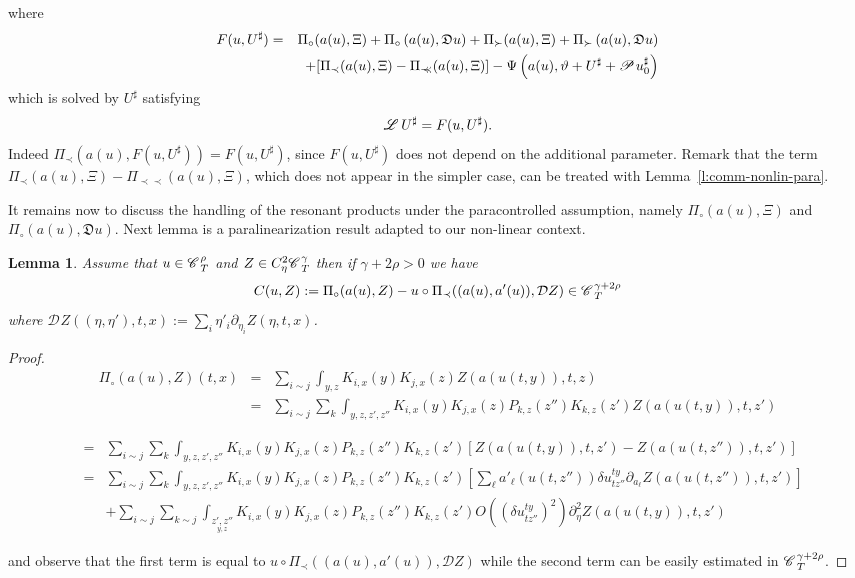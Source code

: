\documentclass[11pt,reqno]{amsart}
\newcommand{\assign}{:=}
\newcommand{\precprec}{\prec\!\!\!\prec}
\newtheorem{lemma}[theorem]{Lemma}
\newcommand{\CC}{\mathscr{C} \hspace{.1em}}
\newcommand{\LL}{\mathscr{L} \hspace{.2em}}
\newcommand{\PP}{\mathscr{P} \hspace{.1em}}
\newcommand{\DF}{\mathfrak{D}}
\begin{document}
where
\begin{eqnarray*}
  F (u, U^{\sharp}) & = & \Pi_{\circ} (a (u), \Xi) + \Pi_{\circ} \left( a (u),
  \DF u \right) + \Pi_{\succ} (a (u), \Xi) + \Pi_{\succ} \left( a (u), \DF u
  \right)\\
  &  & + [\Pi_{\prec} (a (u), \Xi) - \Pi_{\precprec} (a (u), \Xi)] - \Psi
  \left( a (u), \vartheta + U^{\sharp} + \PP u^{\sharp}_0 \right)
\end{eqnarray*}
which is solved by $U^{\sharp}$ satisfying
\[ \LL U^{\sharp} = F (u, U^{\sharp}) . \]
Indeed $\Pi_{\prec} (a (u), F (u, U^{\sharp})) = F (u, U^{\sharp})$, since $F
(u, U^{\sharp})$ does not depend on the additional parameter. Remark that the
term $\Pi_{\prec} (a (u), \Xi) - \Pi_{\precprec} (a (u), \Xi)$, which does not
appear in the simpler case, can be treated with
Lemma~\ref{l:comm-nonlin-para}.

It remains now to discuss the handling of the resonant products under the
paracontrolled assumption, namely $\Pi_{\circ} (a (u), \Xi)$ and $\Pi_{\circ}
\left( a (u), \DF u \right)$. Next lemma is a paralinearization result adapted
to our non-linear context.

\begin{lemma}
  Assume that $u \in \CC_T^{\rho}$ and $Z \in C_{\eta}^2 \CC^{\gamma}_T$ then
  if $\gamma + 2 \rho > 0$ we have
  \[ C (u, Z) \assign \Pi_{\circ} (a (u), Z) - u \circ \Pi_{\prec} ((a (u), a'
     (u)), \mathcal{D}Z) \in \CC_T^{\gamma + 2 \rho} \]
  where $\mathcal{D}_{} Z ((\eta, \eta'), t, x) \assign \sum_i \eta'_i
  \partial_{\eta_i} Z (\eta, t, x)$.
\end{lemma}

\begin{proof}
  
  \begin{eqnarray*}
    \Pi_{\circ} (a (u), Z) (t, x) & = & \sum_{i \sim j} \int_{y, z} K_{i, x}
    (y) K_{j, x} (z) Z (a (u (t, y)), t, z)\\
    & = & \sum_{i \sim j} \sum_k \int_{y, z, z', z''} K_{i, x} (y) K_{j, x}
    (z) P_{k, z} (z'') K_{k, z} (z') Z (a (u (t, y)), t, z')
  \end{eqnarray*}
  
\begin{eqnarray*}
  & = & \sum_{i \sim j} \sum_k \int_{y, z, z', z''} K_{i, x} (y) K_{j, x} (z)
     P_{k, z} (z'') K_{k, z} (z') [Z (a (u (t, y)), t, z') - Z (a (u (t,
     z'')), t, z')] \\
  & = & \sum_{i \sim j} \sum_k \int_{y, z, z', z''} K_{i, x} (y) K_{j, x} (z)
     P_{k, z} (z'') K_{k, z} (z')  \left[ \sum_{\ell} a'_{\ell} (u (t, z'')) \delta u^{t y}_{t z''} \partial_{a_{\ell}} Z (a (u (t, z'')), t, z') \right] \\
  & & + \sum_{i \sim j} \sum_{k \sim j} \int_{\underset{y, z}{z', z''}} K_{i,
     x} (y) K_{j, x} (z) P_{k, z} (z'') K_{k, z} (z') O ((\delta u^{t y}_{t z''})^2) \partial_{\eta}^2 Z (a (u (t, y)), t, z') 
\end{eqnarray*}     

  and observe that the first term is equal to $u \circ \Pi_{\prec} ((a (u), a'
  (u)), \mathcal{D}Z)$ while the second term can be easily estimated in
  $\CC_T^{\gamma + 2 \rho}$. 
\end{proof}
\end{document}
